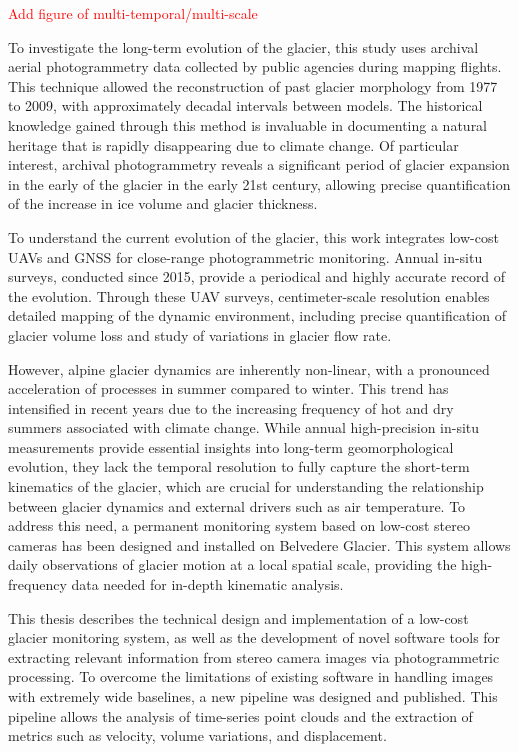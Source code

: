 \textcolor{red}{Add figure of multi-temporal/multi-scale}

To investigate the long-term evolution of the glacier, this study uses archival aerial photogrammetry data collected by public agencies during mapping flights.
This technique allowed the reconstruction of past glacier morphology from 1977 to 2009, with approximately decadal intervals between models.  
The historical knowledge gained through this method is invaluable in documenting a natural heritage that is rapidly disappearing due to climate change. 
Of particular interest, archival photogrammetry reveals a significant period of glacier expansion in the early of the glacier in the early 21st century, allowing precise quantification of the increase in ice volume and glacier thickness.

To understand the current evolution of the glacier, this work integrates low-cost UAVs and GNSS for close-range photogrammetric monitoring.
Annual in-situ surveys, conducted since 2015, provide a periodical and highly accurate record of the evolution. 
Through these UAV surveys, centimeter-scale resolution enables detailed mapping of the dynamic environment, including precise quantification of glacier volume loss and study of variations in glacier flow rate.

However, alpine glacier dynamics are inherently non-linear, with a pronounced acceleration of processes in summer compared to winter.  
This trend has intensified in recent years due to the increasing frequency of hot and dry summers associated with climate change. 
While annual high-precision in-situ measurements provide essential insights into long-term geomorphological evolution, they lack the temporal resolution to fully capture the short-term kinematics of the glacier, which are crucial for
understanding the relationship between glacier dynamics and external drivers such as air temperature.
To address this need, a permanent monitoring system based on low-cost stereo cameras has been designed and installed on Belvedere Glacier. 
This system allows daily observations of glacier motion at a local spatial scale,
providing the high-frequency data needed for in-depth kinematic analysis.

This thesis describes the technical design and implementation of a low-cost glacier monitoring system, as well as the development of novel software tools for extracting relevant information from stereo camera images via photogrammetric processing. 
To overcome the limitations of existing software in handling images with extremely wide baselines, a new pipeline was designed and published. 
This pipeline allows the analysis of time-series point clouds and the extraction of metrics such as velocity, volume variations, and displacement.

